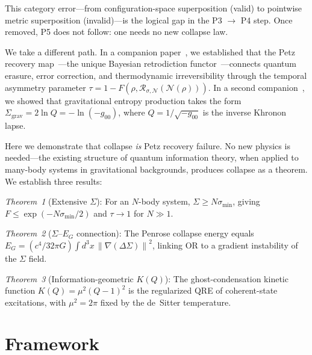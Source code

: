 \documentclass[prl,twocolumn,superscriptaddress,longbibliography,floatfix]{revtex4-2}
\newcommand{\Petz}{\mathcal{R}}
\newcommand{\chan}{\mathcal{N}}
\newcommand{\norm}[1]{\left\|#1\right\|}
\newcommand{\tauasym}{\tau}
\newcommand{\Sgrav}{\Sigma_{\mathrm{grav}}}
\begin{document}
This category error---from configuration-space superposition (valid)
to pointwise metric superposition (invalid)---is the logical gap in
the P3 $\to$ P4 step.  Once removed, P5 does not follow: one needs
no new collapse law.

We take a different path.  In a companion paper~\cite{Paper1}, we
established that the Petz recovery map~\cite{Petz1986,Petz1988}---the
unique Bayesian retrodiction functor~\cite{Parzygnat2023}---connects
quantum erasure, error correction, and thermodynamic irreversibility
through the temporal asymmetry parameter
$\tauasym = 1 - F(\rho,\Petz_{\sigma,\chan}(\chan(\rho)))$.  In a
second companion~\cite{Paper2}, we showed that gravitational entropy
production takes the form $\Sgrav = 2\ln Q = -\ln(-g_{00})$, where
$Q = 1/\sqrt{-g_{00}}$ is the inverse Khronon lapse.

Here we demonstrate that collapse \emph{is} Petz recovery failure.
No new physics is needed---the existing structure of quantum
information theory, when applied to many-body systems in
gravitational backgrounds, produces collapse as a theorem.  We
establish three results:

\emph{Theorem~1} (Extensive $\Sigma$): For an $N$-body system,
$\Sigma \geq N\sigma_{\min}$, giving
$F \leq \exp(-N\sigma_{\min}/2)$ and $\tauasym \to 1$ for
$N \gg 1$.

\emph{Theorem~2} ($\Sigma$--$E_G$ connection): The Penrose collapse
energy equals
$E_G = (c^4/32\pi G)\int d^3x\,\norm{\nabla(\Delta\Sigma)}^2$,
linking OR to a gradient instability of the $\Sigma$ field.

\emph{Theorem~3} (Information-geometric $K(Q)$): The ghost-condensation
kinetic function $K(Q) = \mu^2(Q-1)^2$ is the regularized QRE of
coherent-state excitations, with $\mu^2 = 2\pi$ fixed by the
de~Sitter temperature.

\section{Framework}
\label{sec:framework}
\end{document}

